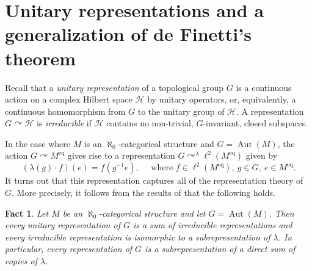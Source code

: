 \documentclass[JEP,XML,SOM,Unicode,published]{cedram}
\let\mathcal\mathscr
\let\actson\curvearrowright
\theoremstyle{plain}
\newtheorem{fact}[theorem]{Fact}
\theoremstyle{definition}
\newcommand{\cH}{\mathcal{H}}
\DeclareMathOperator{\Aut}{Aut}
\newcommand{\eq}{^{\mathrm{eq}}}
\begin{document}
\section{Unitary representations and a generalization of de Finetti's theorem}
\label{sec:general-de-finett}

Recall that a \emph{unitary representation} of a topological group $G$ is a continuous action on a complex Hilbert space $\cH$ by unitary operators, or, equivalently, a continuous homomorphism from $G$ to the unitary group of $\cH$. A representation $G \actson \cH$ is \emph{irreducible} if $\cH$ contains no non-trivial, $G$-invariant, closed subspaces.

In the case where $M$ is an $\aleph_0$-categorical structure and $G = \Aut(M)$, the action $G \actson M\eq$ gives rise to a representation $G \actson^\lambda \ell^2(M\eq)$ given by
\begin{equation*}
(\lambda(g) \cdot f)(e) = f(g^{-1} e), \quad \text{ where } f \in \ell^2(M\eq),\ g \in G,\ e \in M\eq.
\end{equation*}
It turns out that this representation captures all of the representation theory of $G$. More precisely, it follows from the results of \cite{Tsankov2012} that the following holds.
\begin{fact}
\label{f:representations}
Let $M$ be an $\aleph_0$-categorical structure and let $G = \Aut(M)$. Then every unitary representation of $G$ is a sum of irreducible representations and every irreducible representation is isomorphic to a subrepresentation of $\lambda$. In particular, every representation of $G$ is a subrepresentation of a direct sum of copies of $\lambda$.
\end{fact}
\end{document}
